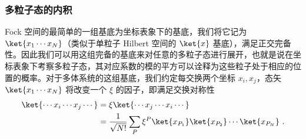 \subsubsection{多粒子态的内积}
Fock 空间的最简单的一组基底为坐标表象下的基底，我们将它记为 $\ket{x_1\cdots x_N}$（类似于单粒子 Hilbert 空间的 $\ket{x}$ 基底），满足正交完备性。因此我们可以用这组完备的基底来对任意的多粒子态进行展开，也就是说在坐标表象下考察多粒子态，其对应系数的模的平方可以诠释为这些粒子处于相应的位置的概率。对于多体系统的这组基底，我们约定每交换两个坐标 $x_i,x_j$，态矢 $\ket{x_1\cdots x_N}$ 将改变一个 $\xi$ 的因子，即满足交换对称性
\begin{equation}
\begin{aligned}
\ket{\cdots x_i \cdots x_j \cdots}& =
\xi \ket{\cdots x_j \cdots x_i \cdots} \\
&=\frac{1}{\sqrt{N!}}\sum_P \xi^P\ket{x_{P_1}}\ket{x_{P_2}}\cdots\ket{x_{P_N}}~.
\end{aligned}
\end{equation}

